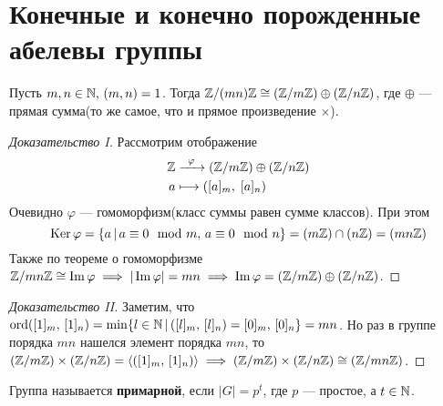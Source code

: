 \documentclass[../main.tex]{subfiles}
\begin{document}
\section{Конечные и конечно порожденные абелевы группы}

\begin{lemma}
\label{lem:6.9}
  Пусть $m, n \in \mathbb{N}, \, (m, n) = 1$. Тогда $\mathbb{Z}/(mn)\mathbb{Z} \cong (\mathbb{Z}/m\mathbb{Z}) \oplus (\mathbb{Z}/n\mathbb{Z})$, где $\oplus$ --- прямая сумма(то же самое, что и прямое произведение $\times$).
\end{lemma}
\begin{proof}[Доказательство I]
 Рассмотрим отображение
  \begin{align*}
    \mathbb{Z} &\xrightarrow{\;\; \varphi \;\;} (\mathbb{Z}/m\mathbb{Z}) \oplus (\mathbb{Z}/n\mathbb{Z}) \\
    a &\longmapsto ([a]_m,\; [a]_n)
  \end{align*}
  Очевидно $\varphi$ --- гомоморфизм(класс суммы равен сумме классов). При этом
  \begin{equation*}
  \operatorname{Ker} \varphi = \{a \, | \, a \equiv 0 \mod m, \, a \equiv 0 \mod n\}
  =
  (m\mathbb{Z}) \cap (n\mathbb{Z}) = (mn\mathbb{Z})
  \end{equation*}
  Также по теореме о гомоморфизме $\mathbb{Z}/mn\mathbb{Z} \cong \operatorname{Im} \varphi \implies |\operatorname{Im} \varphi| = mn \implies \operatorname{Im} \varphi = (\mathbb{Z}/m\mathbb{Z}) \oplus (\mathbb{Z}/n\mathbb{Z})$.
\end{proof}
\begin{proof}[Доказательство II]
  Заметим, что $\operatorname{ord}([1]_m,\, [1]_n) = \min \{l \in \mathbb{N} \, | \, ([l]_m,\, [l]_n) = [0]_m, \, [0]_n\} = mn$. Но раз в группе порядка $mn$ нашелся элемент порядка $mn$, то $(\mathbb{Z}/m\mathbb{Z}) \times (\mathbb{Z}/n\mathbb{Z}) = \left\langle ([1]_m, \, [1]_n) \right\rangle \implies (\mathbb{Z}/m\mathbb{Z}) \times (\mathbb{Z}/n\mathbb{Z}) \cong (\mathbb{Z}/mn\mathbb{Z})$.
\end{proof}

\begin{definition}
  Группа называется \textbf{примарной}, если $|G| = p^t$, где $p$ --- простое, а $t \in \mathbb{N}$.
\end{definition}
\end{document}
